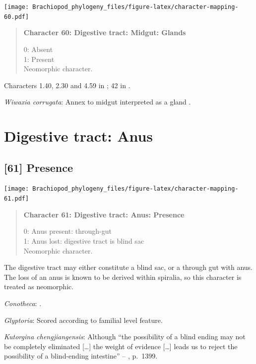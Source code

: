 \documentclass[openany]{book}
\begin{document}
\texttt{[image: Brachiopod\_phylogeny\_files/figure-latex/character-mapping-60.pdf]}

\begin{quote}
\textbf{Character 60: Digestive tract: Midgut: Glands}

0: Absent\\
1: Present\\
Neomorphic character.
\end{quote}

Characters 1.40, 2.30 and 4.59 in \citet{SPS1996}; 42 in
\citet{Haszprunar2000}.

\hypertarget{Wiwaxia_corrugata-coding-60}{}
\emph{Wiwaxia corrugata}: Annex to midgut interpreted as a gland
\citep{Smith2012M}.

\section{Digestive tract: Anus}\label{digestive-tract-anus}

\subsection*{{[}61{]} Presence}\label{presence-2}

\texttt{[image: Brachiopod\_phylogeny\_files/figure-latex/character-mapping-61.pdf]}

\begin{quote}
\textbf{Character 61: Digestive tract: Anus: Presence}

0: Anus present: through-gut\\
1: Anus lost: digestive tract is blind sac\\
Neomorphic character.
\end{quote}

The digestive tract may either constitute a blind sac, or a through gut
with anus. The loss of an anus is known to be derived within spiralia,
so this character is treated as neomorphic.

\hypertarget{Conotheca-coding-61}{}
\emph{Conotheca}: \citep{Devaere2014}.

\hypertarget{Glyptoria-coding-61}{}
\emph{Glyptoria}: Scored according to familial level feature.

\hypertarget{Kutorgina_chengjiangensis-coding-61}{}
\emph{Kutorgina chengjiangensis}: Although ``the possibility of a blind
ending may not be completely eliminated {[}\ldots{}{]} the weight of
evidence {[}\ldots{}{]} leads us to reject the possibility of a
blind-ending intestine'' --
\citet{Zhang2007Rhynchonelliformeanbrachiopods}, p.~1399.
\end{document}
